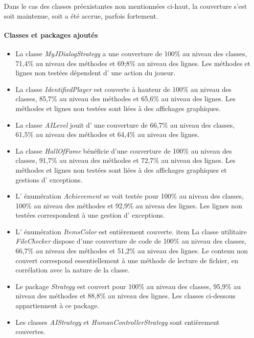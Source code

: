 \documentclass[12pt, openany]{report}
\begin{document}
Dans le cas des classes préexistantes non mentionnées ci-haut, la couverture s'est soit maintenue, soit a été accrue, parfois fortement.

\paragraph{Classes et packages ajoutés}

\begin{itemize}
	\item La classe \mbox{\textit{MyJDialogStrategy}} a une couverture de 100\% au niveau des classes, 71,4\% au niveau des méthodes et 69;8\% au niveau des lignes. Les méthodes et lignes non testées dépendent d' une action du joueur.
	\item La classe \mbox{\textit{IdentifiedPlayer}} est couverte à hauteur de 100\% au niveau des classes, 85,7\% au niveau des méthodes et 65,6\% au niveau des lignes. Les méthodes et lignes non testées sont liées à des affichages graphiques.
	\item La classe \mbox{\textit{AILevel}} jouit d' une couverture de 66,7\% au niveau des classes, 61,5\% au niveau des méthodes et 64,4\% au niveau des lignes. %
	\item La classe \mbox{\textit{HallOfFame}} bénéficie d'une couverture de 100\% au niveau des classes, 91,7\% au niveau des méthodes et 72,7\% au niveau des lignes. Les méthodes et lignes non testées sont liées à des affichages graphiques et gestions d' exceptions.
	\item L' énumération \mbox{\textit{Achievement}} se voit testée pour 100\% au niveau des classes, 100\% au niveau des méthodes et 92,9\% au niveau des lignes. Les lignes non testées correspondent à une gestion d' exceptions.
	\item L' énumération \mbox{\textit{ItemsColor}} est entièrement couverte.
	item La classe utilitaire \mbox{\textit{FileChecker}} dispose d'une couverture de code de 100\% au niveau des classes, 66,7\% au niveau des méthodes et 51,2\% au niveau des lignes. Le contenu non couvert correspond essentiellement à une méthode de lecture de fichier, en corrélation avec la nature de la classe.
	\item Le package \mbox{\textit{Strategy}} est couvert pour 100\% au niveau des classes, 95,9\% au niveau des méthodes et 88,8\% au niveau des lignes. Les classes ci-dessous appartiennent à ce package.
	\item Les classes \mbox{\textit{AIStrategy}} et \mbox{\textit{HumanControllerStrategy}} sont entièrement couvertes.

\end{itemize}
\end{document}
